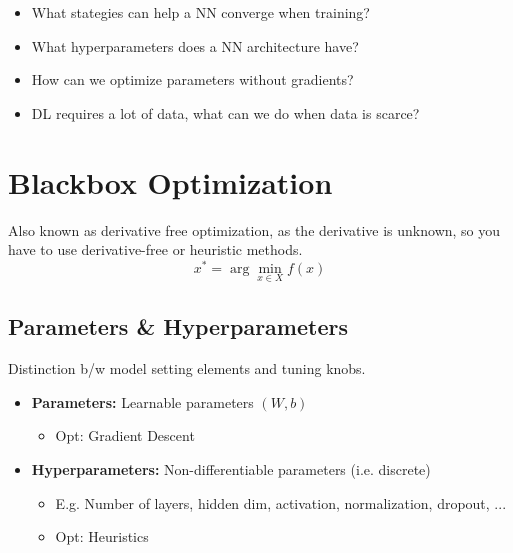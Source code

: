 \begin{summary}
    \begin{itemize}
        \item What stategies can help a NN converge when training?
        \item What hyperparameters does a NN architecture have?
        \item How can we optimize parameters without gradients? 
        \item DL requires a lot of data, what can we do when data is scarce?
    \end{itemize}
\end{summary}

\section{Blackbox Optimization}
\begin{motivation}
    Also known as derivative free optimization, as the derivative is unknown, so you have to use derivative-free or heuristic methods. 
    \begin{equation*}
        x^* = \arg\min_{x \in X} f(x)
    \end{equation*}
\end{motivation}

\subsection{Parameters \& Hyperparameters}
\begin{definition}
    Distinction b/w model setting elements and tuning knobs.
    \begin{itemize}
        \item \textbf{Parameters:} Learnable parameters $(W,b)$
        \begin{itemize}
            \item Opt: Gradient Descent
        \end{itemize}
        \item \textbf{Hyperparameters:} Non-differentiable parameters (i.e. discrete)
        \begin{itemize}
            \item E.g. Number of layers, hidden dim, activation, normalization, dropout, ...
            \item Opt: Heuristics
        \end{itemize}
    \end{itemize}
\end{definition}
\newpage


